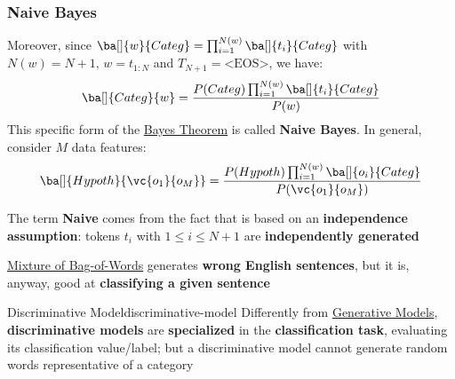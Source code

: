 \subsubsection{Naive Bayes}\label{sub:in_naive_bayes} %
Moreover, since $\ba[]{w}{Categ} = \prod_{i = 1}^{N(w)}\ba[]{t_i}{Categ}$ with $N(w) = N+1,\,w = t_{1:N}$ and $T_{N+1} = \text{<EOS>}$, we have:
\[
    \ba[]{Categ}{w} = \frac{P(Categ)\prod_{i=1}^{N(w)}\ba[]{t_i}{Categ}}{P(w)}
\]
This specific form of the \hyperref[sub:in_bayes_theorem]{Bayes Theorem} is called \textbf{Naive Bayes}.
\emptyln{}
In general, consider $M$ data features:
\[
    \ba[]{Hypoth}{\vc{o_1}{o_M}} = \frac{P(Hypoth)\prod_{i=1}^{N(w)}\ba[]{o_i}{Categ}}{P(\vc{o_1}{o_M})}
\]
\begin{note}
    The term \textbf{Naive} comes from the fact that is based on an \textbf{independence assumption}: tokens $t_i$ with $1\le i\le N+1$ are \textbf{independently generated}
\end{note}
\begin{warning}
    \hyperref[sub:lm_mixture_of_bag_of_words]{Mixture of Bag-of-Words} generates \textbf{wrong English sentences}, but it is, anyway, good at \textbf{classifying a given sentence}
\end{warning}
\begin{definition}{Discriminative Model}{discriminative-model}
    Differently from \hyperref[def:generative-model]{Generative Models}, \textbf{discriminative models} are \textbf{specialized} in the \textbf{classification task}, evaluating its classification value/label; but a discriminative model cannot generate random words representative of a category
\end{definition}
%
